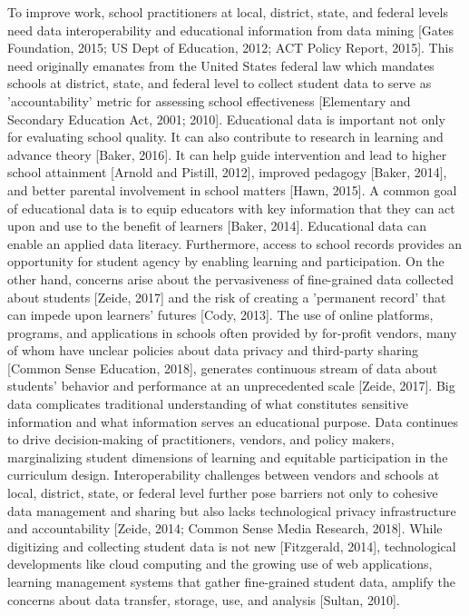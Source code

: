 \documentclass{article}
\begin{document}
To improve work, school practitioners at local, district, state, and federal levels need data interoperability and educational information from data mining [Gates Foundation, 2015; US Dept of Education, 2012; ACT Policy Report, 2015]. This need originally emanates from the United States federal law which mandates schools at district, state, and federal level to collect student data to serve as 'accountability' metric for assessing school effectiveness [Elementary and Secondary Education Act, 2001; 2010].
\bigbreak
Educational data is important not only for evaluating school quality. It can also contribute to research in learning and advance theory [Baker, 2016]. It can help guide intervention and lead to higher school attainment [Arnold and Pistill, 2012], improved pedagogy [Baker, 2014], and better parental involvement in school matters [Hawn, 2015]. A common goal of educational data is to equip educators with key information that they can act upon and use to the benefit of learners [Baker, 2014]. Educational data can enable an applied data literacy. Furthermore, access to school records provides an opportunity for student agency by enabling learning and participation.
\bigbreak
On the other hand, concerns arise about the pervasiveness of fine-grained data collected about students [Zeide, 2017] and the risk of creating a 'permanent record' that can impede upon learners' futures [Cody, 2013]. The use of online platforms, programs, and applications in schools often provided by for-profit vendors, many of whom have unclear policies about data privacy and third-party sharing [Common Sense Education, 2018], generates continuous stream of data about students' behavior and performance at an unprecedented scale [Zeide, 2017]. Big data complicates traditional understanding of what constitutes sensitive information and what information serves an educational purpose. Data continues to drive decision-making of practitioners, vendors, and policy makers, marginalizing student dimensions of learning and equitable participation in the curriculum design.
\bigbreak
Interoperability challenges between vendors and schools at local, district, state, or federal level further pose barriers not only to cohesive data management and sharing but also lacks technological privacy infrastructure and accountability [Zeide, 2014; Common Sense Media Research, 2018]. While digitizing and collecting student data is not new [Fitzgerald, 2014], technological developments like cloud computing and the growing use of web applications, learning management systems that gather fine-grained student data, amplify the concerns about data transfer, storage, use, and analysis [Sultan, 2010].
\end{document}
